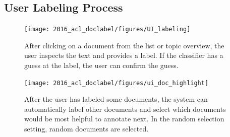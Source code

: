\subsection{User Labeling Process}\label{sub:interaction}
\begin{figure}[t!]

  \begin{center}
  \texttt{[image: 2016\_acl\_doclabel/figures/UI\_labeling]}
  \end{center}

	\caption{After clicking on a document from the list or
          topic overview, the user inspects the text and provides
          a label.  If the classifier has a guess at the
          label, the user can confirm the guess.}
\label{fig:UI-label}
\end{figure}

\begin{figure}[t!]

  \begin{center}
  \texttt{[image: 2016\_acl\_doclabel/figures/ui\_doc\_highlight]}
  \end{center}
  \caption{After the user has labeled some documents, the system can
    automatically label other documents and select which documents
    would be most helpful to annotate next.  In the random selection
    setting, random documents are selected.}
\label{fig:UI-highlight}
\end{figure}



